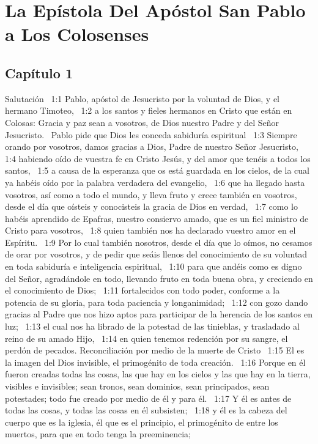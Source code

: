 \chapter{La Epístola Del Apóstol San Pablo a Los Colosenses}


\section*{Capítulo 1}
Salutación  
1:1 Pablo, apóstol de Jesucristo por la voluntad de Dios, y el hermano Timoteo,  
1:2 a los santos y fieles hermanos en Cristo que están en Colosas: Gracia y paz sean a vosotros, de Dios nuestro Padre y del Señor Jesucristo.  
Pablo pide que Dios les conceda sabiduría espiritual  
1:3 Siempre orando por vosotros, damos gracias a Dios, Padre de nuestro Señor Jesucristo,  
1:4 habiendo oído de vuestra fe en Cristo Jesús, y del amor que tenéis a todos los santos,  
1:5 a causa de la esperanza que os está guardada en los cielos, de la cual ya habéis oído por la palabra verdadera del evangelio,  
1:6 que ha llegado hasta vosotros, así como a todo el mundo, y lleva fruto y crece también en vosotros, desde el día que oísteis y conocisteis la gracia de Dios en verdad,  
1:7 como lo habéis aprendido de Epafras, nuestro consiervo amado, que es un fiel ministro de Cristo para vosotros,  
1:8 quien también nos ha declarado vuestro amor en el Espíritu.  
1:9 Por lo cual también nosotros, desde el día que lo oímos, no cesamos de orar por vosotros, y de pedir que seáis llenos del conocimiento de su voluntad en toda sabiduría e inteligencia espiritual,  
1:10 para que andéis como es digno del Señor, agradándole en todo, llevando fruto en toda buena obra, y creciendo en el conocimiento de Dios;  
1:11 fortalecidos con todo poder, conforme a la potencia de su gloria, para toda paciencia y longanimidad;  
1:12 con gozo dando gracias al Padre que nos hizo aptos para participar de la herencia de los santos en luz;  
1:13 el cual nos ha librado de la potestad de las tinieblas, y trasladado al reino de su amado Hijo,  
1:14 en quien tenemos redención por su sangre, el perdón de pecados. 
Reconciliación por medio de la muerte de Cristo  
1:15 El es la imagen del Dios invisible, el primogénito de toda creación.  
1:16 Porque en él fueron creadas todas las cosas, las que hay en los cielos y las que hay en la tierra, visibles e invisibles; sean tronos, sean dominios, sean principados, sean potestades; todo fue creado por medio de él y para él.  
1:17 Y él es antes de todas las cosas, y todas las cosas en él subsisten;  
1:18 y él es la cabeza del cuerpo que es la iglesia, él que es el principio, el primogénito de entre los muertos, para que en todo tenga la preeminencia;  
